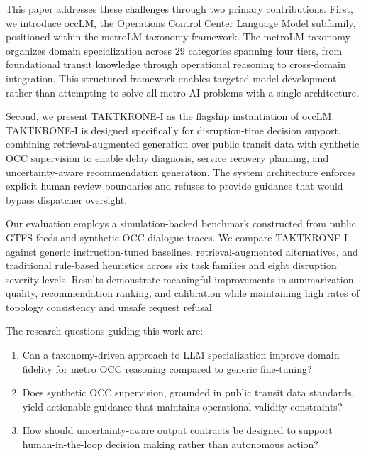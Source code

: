 \documentclass{IEEEoj}
\begin{document}
This paper addresses these challenges through two primary contributions. First, we introduce occLM, the Operations Control Center Language Model subfamily, positioned within the metroLM taxonomy framework. The metroLM taxonomy organizes domain specialization across 29 categories spanning four tiers, from foundational transit knowledge through operational reasoning to cross-domain integration. This structured framework enables targeted model development rather than attempting to solve all metro AI problems with a single architecture.

Second, we present TAKTKRONE-I as the flagship instantiation of occLM. TAKTKRONE-I is designed specifically for disruption-time decision support, combining retrieval-augmented generation over public transit data with synthetic OCC supervision to enable delay diagnosis, service recovery planning, and uncertainty-aware recommendation generation. The system architecture enforces explicit human review boundaries and refuses to provide guidance that would bypass dispatcher oversight.

Our evaluation employs a simulation-backed benchmark constructed from public GTFS feeds and synthetic OCC dialogue traces. We compare TAKTKRONE-I against generic instruction-tuned baselines, retrieval-augmented alternatives, and traditional rule-based heuristics across six task families and eight disruption severity levels. Results demonstrate meaningful improvements in summarization quality, recommendation ranking, and calibration while maintaining high rates of topology consistency and unsafe request refusal.

The research questions guiding this work are:
\begin{enumerate}
    \item Can a taxonomy-driven approach to LLM specialization improve domain fidelity for metro OCC reasoning compared to generic fine-tuning?
    \item Does synthetic OCC supervision, grounded in public transit data standards, yield actionable guidance that maintains operational validity constraints?
    \item How should uncertainty-aware output contracts be designed to support human-in-the-loop decision making rather than autonomous action?
\end{enumerate}
\end{document}
